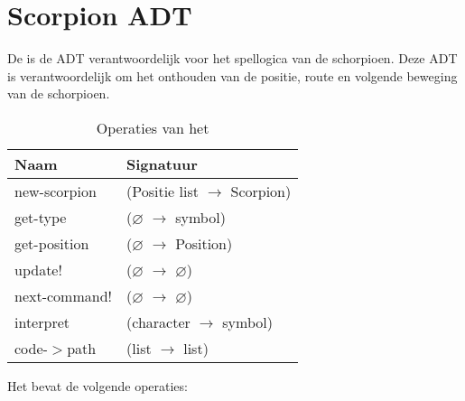 \section{Scorpion ADT}
\label{section:scorpion}
De \texttt{} is de ADT verantwoordelijk voor het spellogica van de schorpioen. 
Deze ADT is verantwoordelijk om het onthouden van de positie, route en volgende beweging van de schorpioen.

\begin{table}[hbt]
\centering
\begin{tabular}{|ll|}
\hline
\rowcolor[HTML]{000000} 
{\color[HTML]{FFFFFF} \textbf{Naam}} & {\color[HTML]{FFFFFF} \textbf{Signatuur}} \\ \hline
new-scorpion    & (Positie list $\rightarrow$ Scorpion) \\ \hline
get-type      & ($\varnothing$ $\rightarrow$ symbol)                        \\ \hline
get-position  & ($\varnothing$ $\rightarrow$ Position)                        \\ \hline
update!                                 & ($\varnothing$ $\rightarrow$ $\varnothing$)                                       \\ \hline
next-command!                                 & ($\varnothing$ $\rightarrow$ $\varnothing$)                                       \\ \hline
interpret                                & (character $\rightarrow$ symbol)                 \\ \hline
code-$>$path                                & (list $\rightarrow$ list)                 \\ \hline
\end{tabular}
\caption{Operaties van het \texttt{}}
\label{table:scorpion}
\end{table}

Het \texttt{} bevat de volgende operaties:

